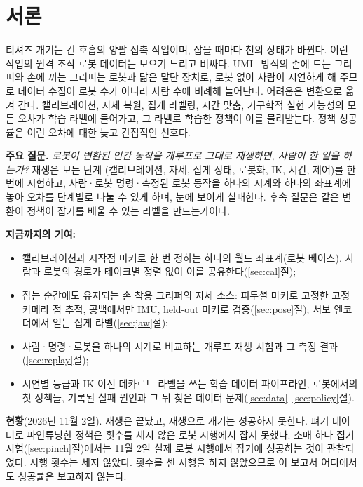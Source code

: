 \documentclass[conference,10pt]{IEEEtran}
\begin{document}
\section{서론}\label{sec:intro}
티셔츠 개기는 긴 호흡의 양팔 접촉 작업이며, 잡을 때마다 천의 상태가 바뀐다. 이런 작업의 원격 조작 로봇 데이터는 모으기 느리고
비싸다. UMI~\cite{chi2024umi} 방식의 손에 드는 그리퍼와 손에 끼는 그리퍼는 로봇과 닮은 말단 장치로, 로봇 없이 사람이 시연하게
해 주므로 데이터 수집이 로봇 수가 아니라 사람 수에 비례해 늘어난다. 어려움은 변환으로 옮겨 간다. 캘리브레이션, 자세 복원, 집게
라벨링, 시간 맞춤, 기구학적 실현 가능성의 모든 오차가 학습 라벨에 들어가고, 그 라벨로 학습한 정책이 이를 물려받는다. 정책
성공률은 이런 오차에 대한 늦고 간접적인 신호다.

\textbf{주요 질문.} \emph{로봇이 변환된 인간 동작을 개루프로 그대로 재생하면, 사람이 한 일을 하는가?} 재생은 모든 단계
(캘리브레이션, 자세, 집게 상태, 로봇화, IK, 시간, 제어)를 한 번에 시험하고, 사람·로봇 명령·측정된 로봇 동작을 하나의 시계와
하나의 좌표계에 놓아 오차를 단계별로 나눌 수 있게 하며, 눈에 보이게 실패한다. 후속 질문은 같은 변환이 정책이 잡기를 배울 수 있는
라벨을 만드는가이다.

\textbf{지금까지의 기여:}
\begin{itemize}
\item 캘리브레이션과 시작점 마커로 한 번 정하는 하나의 월드 좌표계(로봇 베이스). 사람과 로봇의 경로가 테이크별 정렬 없이 이를
  공유한다(\ref{sec:cal}절);
\item 잡는 순간에도 유지되는 손 착용 그리퍼의 자세 소스: 피두셜 마커로 고정한 고정 카메라 점 추적, 공백에서만 IMU, held-out
  마커로 검증(\ref{sec:pose}절); 서보 엔코더에서 얻는 집게 라벨(\ref{sec:jaw}절);
\item 사람·명령·로봇을 하나의 시계로 비교하는 개루프 재생 시험과 그 측정 결과(\ref{sec:replay}절);
\item 시연별 등급과 IK 이전 데카르트 라벨을 쓰는 학습 데이터 파이프라인, 로봇에서의 첫 정책들, 기록된 실패 원인과 그 뒤
  찾은 데이터 문제(\ref{sec:data}--\ref{sec:policy}절).
\end{itemize}

\textbf{현황}(2026년 11월 2일). 재생은 끝났고, 재생으로 개기는 성공하지 못한다. 펴기 데이터로 파인튜닝한 정책은 횟수를 세지 않은
로봇 시행에서 잡지 못했다. 소매 하나 집기 시험(\ref{sec:pinch}절)에서는 11월 2일 실제 로봇 시행에서 잡기에 성공하는 것이
관찰되었다. 시행 횟수는 세지 않았다. 횟수를
센 시행을 하지 않았으므로 이 보고서 어디에서도 성공률은 보고하지 않는다.
\end{document}
